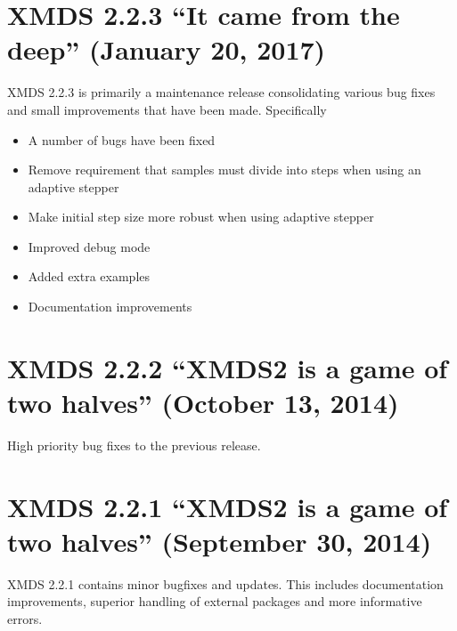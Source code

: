 \documentclass[letterpaper,10pt,english]{sphinxmanual}
\begin{document}
\section{XMDS 2.2.3 “It came from the deep” (January 20, 2017)}
\label{\detokenize{news:xmds-2-2-3-it-came-from-the-deep-january-20-2017}}
\sphinxAtStartPar
XMDS 2.2.3 is primarily a maintenance release consolidating various bug fixes and small improvements that have been made. Specifically
\begin{itemize}
\item {} 
\sphinxAtStartPar
A number of bugs have been fixed

\item {} 
\sphinxAtStartPar
Remove requirement that samples must divide into steps when using an adaptive stepper

\item {} 
\sphinxAtStartPar
Make initial step size more robust when using adaptive stepper

\item {} 
\sphinxAtStartPar
Improved debug mode

\item {} 
\sphinxAtStartPar
Added extra examples

\item {} 
\sphinxAtStartPar
Documentation improvements

\end{itemize}


\section{XMDS 2.2.2 “XMDS2 is a game of two halves” (October 13, 2014)}
\label{\detokenize{news:xmds-2-2-2-xmds2-is-a-game-of-two-halves-october-13-2014}}
\sphinxAtStartPar
High priority bug fixes to the previous release.


\section{XMDS 2.2.1 “XMDS2 is a game of two halves” (September 30, 2014)}
\label{\detokenize{news:xmds-2-2-1-xmds2-is-a-game-of-two-halves-september-30-2014}}
\sphinxAtStartPar
XMDS 2.2.1 contains minor bugfixes and updates. This includes documentation improvements, superior handling of external packages and more informative errors.
\end{document}
